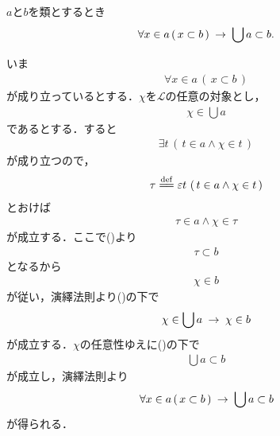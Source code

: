 	\begin{screen}
		\begin{thm}[部分集合の合併は部分類]\label{thm:union_of_subsets_is_subclass}
			$a$と$b$を類とするとき
			\begin{align}
				\forall x \in a\, (\, x \subset b\, ) \hspace{0.25em}\rightarrow\hspace{0.25em} \bigcup a \subset b.
			\end{align}
		\end{thm}
	\end{screen}
	
	\begin{sketch}
		いま
		\begin{align}
			\forall x \in a\, (\, x \subset b\, )
			\label{fom:thm_union_of_subsets_is_subclass_1}
		\end{align}
		が成り立っているとする．$\chi$を$\mathcal{L}$の任意の対象とし，
		\begin{align}
			\chi \in \bigcup a
		\end{align}
		であるとする．すると
		\begin{align}
			\exists t\, \left(\, t \in a \wedge \chi \in t\, \right)
		\end{align}
		が成り立つので，
		\begin{align}
			\tau \defeq \varepsilon t\, \left(\, t \in a \wedge \chi \in t\, \right)
		\end{align}
		とおけば
		\begin{align}
			\tau \in a \wedge \chi \in \tau
		\end{align}
		が成立する．ここで()より
		\begin{align}
			\tau \subset b
		\end{align}
		となるから
		\begin{align}
			\chi \in b
		\end{align}
		が従い，演繹法則より()の下で
		\begin{align}
			\chi \in \bigcup a \hspace{0.25em}\rightarrow\hspace{0.25em} \chi \in b
		\end{align}
		が成立する．$\chi$の任意性ゆえに()の下で
		\begin{align}
			\bigcup a \subset b
		\end{align}
		が成立し，演繹法則より
		\begin{align}
			\forall x \in a\, (\, x \subset b\, ) \hspace{0.25em}\rightarrow\hspace{0.25em} \bigcup a \subset b
		\end{align}
		が得られる．
		\QED
	\end{sketch}